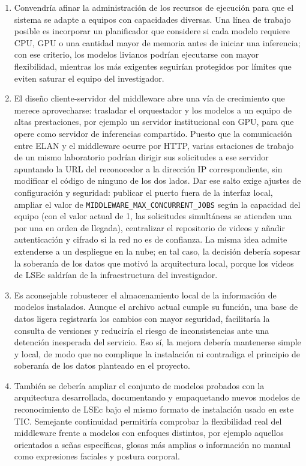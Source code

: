 \begin{enumerate}
    \item Convendría afinar la administración de los recursos de ejecución para que el sistema se adapte a equipos con capacidades diversas. Una línea de trabajo posible es incorporar un planificador que considere si cada modelo requiere CPU, GPU o una cantidad mayor de memoria antes de iniciar una inferencia; con ese criterio, los modelos livianos podrían ejecutarse con mayor flexibilidad, mientras los más exigentes seguirían protegidos por límites que eviten saturar el equipo del investigador.

    \item El diseño cliente-servidor del middleware abre una vía de crecimiento que merece aprovecharse: trasladar el orquestador y los modelos a un equipo de altas prestaciones, por ejemplo un servidor institucional con GPU, para que opere como servidor de inferencias compartido. Puesto que la comunicación entre ELAN y el middleware ocurre por HTTP, varias estaciones de trabajo de un mismo laboratorio podrían dirigir sus solicitudes a ese servidor apuntando la URL del reconocedor a la dirección IP correspondiente, sin modificar el código de ninguno de los dos lados. Dar ese salto exige ajustes de configuración y seguridad: publicar el puerto fuera de la interfaz local, ampliar el valor de \texttt{MIDDLEWARE\_MAX\_CONCURRENT\_JOBS} según la capacidad del equipo (con el valor actual de 1, las solicitudes simultáneas se atienden una por una en orden de llegada), centralizar el repositorio de videos y añadir autenticación y cifrado si la red no es de confianza. La misma idea admite extenderse a un despliegue en la nube; en tal caso, la decisión debería sopesar la soberanía de los datos que motivó la arquitectura local, porque los videos de LSEc saldrían de la infraestructura del investigador.

    \item Es aconsejable robustecer el almacenamiento local de la información de modelos instalados. Aunque el archivo actual cumple su función, una base de datos ligera registraría los cambios con mayor seguridad, facilitaría la consulta de versiones y reduciría el riesgo de inconsistencias ante una detención inesperada del servicio. Eso sí, la mejora debería mantenerse simple y local, de modo que no complique la instalación ni contradiga el principio de soberanía de los datos planteado en el proyecto.

    \item También se debería ampliar el conjunto de modelos probados con la arquitectura desarrollada, documentando y empaquetando nuevos modelos de reconocimiento de LSEc bajo el mismo formato de instalación usado en este TIC. Semejante continuidad permitiría comprobar la flexibilidad real del middleware frente a modelos con enfoques distintos, por ejemplo aquellos orientados a señas específicas, glosas más amplias o información no manual como expresiones faciales y postura corporal.


\end{enumerate}
